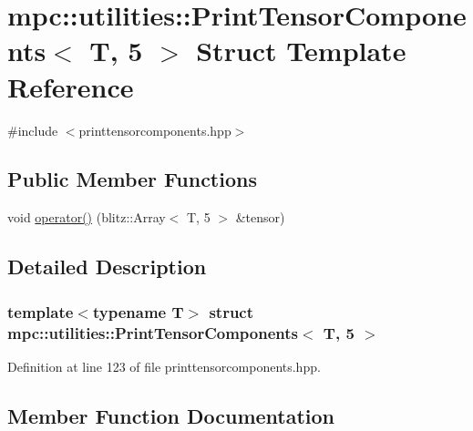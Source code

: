 \hypertarget{structmpc_1_1utilities_1_1_print_tensor_components_3_01_t_00_015_01_4}{}\section{mpc\+:\+:utilities\+:\+:Print\+Tensor\+Components$<$ T, 5 $>$ Struct Template Reference}
\label{structmpc_1_1utilities_1_1_print_tensor_components_3_01_t_00_015_01_4}


{\ttfamily \#include $<$printtensorcomponents.\+hpp$>$}

\subsection*{Public Member Functions}
\begin{DoxyCompactItemize}
\item 
void \mbox{\hyperlink{structmpc_1_1utilities_1_1_print_tensor_components_3_01_t_00_015_01_4_ae06f93e705c882d56433ef0ca2629351}{operator()}} (blitz\+::\+Array$<$ T, 5 $>$ \&tensor)
\end{DoxyCompactItemize}


\subsection{Detailed Description}
\subsubsection*{template$<$typename T$>$\newline
struct mpc\+::utilities\+::\+Print\+Tensor\+Components$<$ T, 5 $>$}



Definition at line 123 of file printtensorcomponents.\+hpp.



\subsection{Member Function Documentation}
\mbox{\label{structmpc_1_1utilities_1_1_print_tensor_components_3_01_t_00_015_01_4_ae06f93e705c882d56433ef0ca2629351}} 
